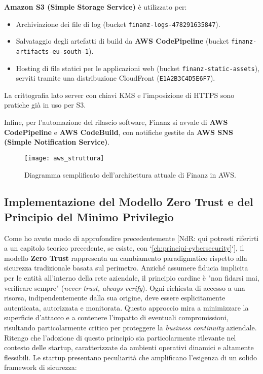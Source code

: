 \textbf{Amazon S3 (Simple Storage Service)} è utilizzato per:
\begin{itemize}
    \item Archiviazione dei file di log (bucket \texttt{finanz-logs-478291635847}).
    \item Salvataggio degli artefatti di build da \textbf{AWS CodePipeline} (bucket \texttt{finanz-artifacts-eu-south-1}).
    \item Hosting di file statici per le applicazioni web (bucket \texttt{finanz-static-assets}), serviti tramite una distribuzione CloudFront (\texttt{E1A2B3C4D5E6F7}).
\end{itemize}
La crittografia lato server con chiavi KMS e l'imposizione di HTTPS sono pratiche già in uso per S3.

Infine, per l'automazione del rilascio software, Finanz si avvale di \textbf{AWS CodePipeline} e \textbf{AWS CodeBuild}, con notifiche gestite da \textbf{AWS SNS (Simple Notification Service)}.

\begin{figure}[h]
  \centering
  \texttt{[image: aws\_struttura]} %
  \caption{Diagramma semplificato dell'architettura attuale di Finanz in AWS.}
  \label{fig:aws_struttura_attuale_cap2}
\end{figure}

\subsection{Implementazione del Modello Zero Trust e del Principio del Minimo Privilegio}
\label{sec:zero-trust-implementation}

Come ho avuto modo di approfondire precedentemente [NdR: qui potresti riferirti a un capitolo teorico precedente, se esiste, con `\ref{ch:principi-cybersecurity}`], il modello \textbf{Zero Trust} rappresenta un cambiamento paradigmatico rispetto alla sicurezza tradizionale basata sul perimetro. Anziché assumere fiducia implicita per le entità all'interno della rete aziendale, il principio cardine è "non fidarsi mai, verificare sempre" (\textit{never trust, always verify}). Ogni richiesta di accesso a una risorsa, indipendentemente dalla sua origine, deve essere esplicitamente autenticata, autorizzata e monitorata. Questo approccio mira a minimizzare la superficie d'attacco e a contenere l'impatto di eventuali compromissioni, risultando particolarmente critico per proteggere la \textit{business continuity} aziendale. Ritengo che l'adozione di questo principio sia particolarmente rilevante nel contesto delle startup, caratterizzate da ambienti operativi dinamici e altamente flessibili. Le startup presentano peculiarità che amplificano l'esigenza di un solido framework di sicurezza:

